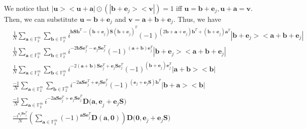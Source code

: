 \documentclass{article}
\begin{document}
We notice that $|\mathbf{u}><\mathbf{u+a}| \odot (|\mathbf{b}+\mathbf{e}_j><\mathbf{v}|) = 1$ iff $\mathbf{u}=\mathbf{b}+\mathbf{e}_j, \mathbf{u+a}=\mathbf{v}$. Then, we can substitute $\mathbf{u} = \mathbf{b}+\mathbf{e}_j$ and $\mathbf{v}=\mathbf{a}+\mathbf{b}+\mathbf{e}_j$. Thus, we have
\begin{align}
	&\frac{1}{N}\sum_{\mathbf{a} \in \mathbb{F}^m_2}{\sum_{\mathbf{b} \in \mathbb{F}^m_2}{i^{\mathbf{b S b}^T -(\mathbf{b+e}_j)\mathbf{S}(\mathbf{b+e}_j)^T} (-1)^{(2\mathbf{b}+\mathbf{a+e}_j)\mathbf{b}^T+(\mathbf{b+e}_j)\mathbf{a}^T} |\mathbf{b+e}_j> <\mathbf{a+b+e}_j |    } }\nonumber \\
	&\frac{1}{N}\sum_{\mathbf{a} \in \mathbb{F}^m_2}{\sum_{\mathbf{b} \in \mathbb{F}^m_2}{i^{-2\mathbf{b S }\mathbf{e}_j^T-\mathbf{e}_j \mathbf{S e}_j^T} (-1)^{(\mathbf{a+b})\mathbf{e}_j^T} |\mathbf{b+e}_j> <\mathbf{a+b+e}_j |    } }\nonumber\\
	& \frac{1}{N}\sum_{\mathbf{a} \in \mathbb{F}^m_2}{\sum_{\mathbf{b} \in \mathbb{F}^m_2}{i^{-2\mathbf{(a+b) S }\mathbf{e}_j^T+\mathbf{e}_j \mathbf{S e}_j^T} (-1)^{(\mathbf{b+e}_j)\mathbf{e}_j^T} |\mathbf{a+b}> <\mathbf{b} |    } }\nonumber \\
	& \frac{-1}{N}\sum_{\mathbf{a} \in \mathbb{F}^m_2}{\sum_{\mathbf{b} \in \mathbb{F}^m_2}{i^{-2\mathbf{a S }\mathbf{e}_j^T+\mathbf{e}_j \mathbf{S e}_j^T} (-1)^{(\mathbf{e}_j+\mathbf{e}_j\mathbf{S})\mathbf{b}^T} |\mathbf{b+a}> <\mathbf{b} |    } } \nonumber \\
		& \frac{-1}{N}\sum_{\mathbf{a} \in \mathbb{F}^m_2}{i^{-2\mathbf{a S }\mathbf{e}_j^T+\mathbf{e}_j \mathbf{S e}_j^T} \mathbf{D(a,e}_j+\mathbf{e}_j\mathbf{S})   }\\
		& \frac{-i^{\mathbf{e}_j \mathbf{S e}_j^T}}{N} \left(\sum_{\mathbf{a} \in \mathbb{F}^m_2}{(-1)^{\mathbf{a S }\mathbf{e}_j^T} \mathbf{D(a,0)}} \right) \mathbf{D(0},\mathbf{e}_j+\mathbf{e}_j \mathbf{S}) \label{FinalRes}
\end{align}
\\
\end{document}

